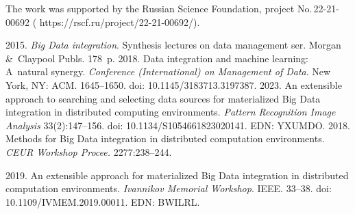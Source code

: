




\vspace*{-20pt}

\Ack

\vspace*{-5pt}

\noindent
The work was supported by the Russian Science Foundation, project  
No.\,22-21-00692 ({\sf  
https://rscf.ru/project/22-21-00692/}).

\vspace*{-4pt}

  \begin{multicols}{2}

\renewcommand{\bibname}{\protect\rmfamily References}

{\small\frenchspacing
 {%
 \begin{thebibliography}{9} 
 
\vspace*{-5pt}
 
 2015. \textit{Big Data integration}.  
Synthesis lectures on data management ser. Morgan \&~Claypool Publs. 
178~p.
 2018. Data integration and machine 
learning: A~natural synergy. \textit{Conference (International) on Management of 
Data}. New York, NY: ACM. 1645--1650. doi: 10.1145/3183713.3197387.
 2023. An extensible approach to 
searching and selecting data sources for materialized Big Data integration in 
distributed computing environments. \textit{Pattern Recognition Image Analysis} 
33(2):147--156. doi: 10.1134/S1054661823020141. EDN: YXUMDO.
 2018. Methods for Big Data integration in distributed 
computation environments. \textit{CEUR Workshop Procee.} 2277:238--244.



 2019. An extensible approach for 
materialized Big Data integration in distributed
 computation environments. 
\textit{Ivannikov Memorial Workshop}. IEEE. 33--38. doi: 
10.1109/IVMEM.2019.00011. EDN: BWILRL.

\pagebreak 


\end{thebibliography}}}
\end{multicols}
